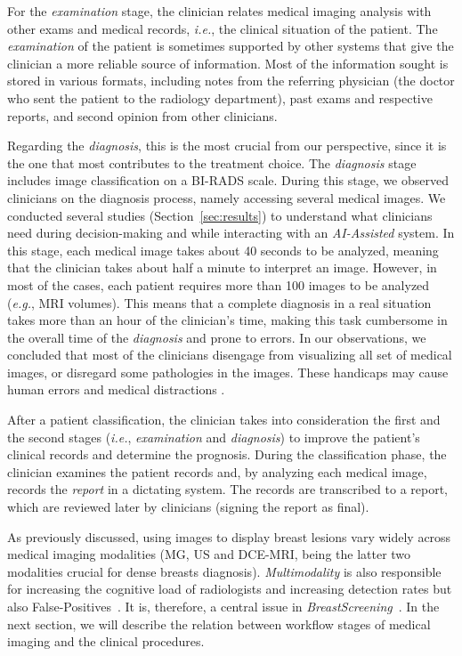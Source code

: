 For the {\it examination} stage, the clinician relates medical imaging analysis with other exams and medical records, {\em i.e.}, the clinical situation of the patient.
The {\it examination} of the patient is sometimes supported by other systems that give the clinician a more reliable source of information.
Most of the information sought is stored in various formats, including notes from the referring physician (the doctor who sent the patient to the radiology department), past exams and respective reports, and second opinion from other clinicians.

Regarding the {\it diagnosis}, this is the most crucial from our perspective, since it is the one that most contributes to the treatment choice.
The {\it diagnosis} stage includes image classification on a BI-RADS scale.
During this stage, we observed clinicians on the diagnosis process, namely accessing several medical images.
We conducted several studies (Section~\ref{sec:results}) to understand what clinicians need during decision-making and while interacting with an {\it AI-Assisted} system.
In this stage, each medical image takes about 40 seconds to be analyzed, meaning that the clinician takes about half a minute to interpret an image.
However, in most of the cases, each patient requires more than 100 images to be analyzed ({\it e.g.}, MRI volumes).
This means that a complete diagnosis in a real situation takes more than an hour of the clinician's time, making this task cumbersome in the overall time of the {\it diagnosis} and prone to errors.
In our observations, we concluded that most of the clinicians disengage from visualizing all set of medical images, or disregard some pathologies in the images.
These handicaps may cause human errors and medical distractions \cite{bruno2015understanding}.

After a patient classification, the clinician takes into consideration the first and the second stages ({\it i.e.}, {\it examination} and {\it diagnosis}) to improve the patient's clinical records and determine the prognosis.
During the classification phase, the clinician examines the patient records and, by analyzing each medical image, records the {\em report} in a dictating system.
The records are transcribed to a report, which are reviewed later by clinicians (signing the report as final).

As previously discussed, using images to display breast lesions vary widely across medical imaging modalities (MG, US and DCE-MRI, being the latter two modalities crucial for dense breasts diagnosis).
{\it Multimodality} is also responsible for increasing the cognitive load of radiologists and increasing detection rates but also False-Positives~\cite{cheung2017integral}.
It is, therefore, a central issue in {\it BreastScreening}~\cite{https://doi.org/10.13140/rg.2.2.25412.68486, wernli2019surveillance}.
In the next section, we will describe the relation between workflow stages of medical imaging and the clinical procedures.


